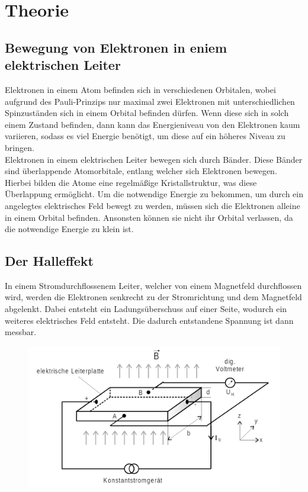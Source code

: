 \section{Theorie}
\label{sec:Theorie}

\subsection{Bewegung von Elektronen in eniem elektrischen Leiter}

\noindent Elektronen in einem Atom befinden sich in verschiedenen Orbitalen, wobei aufgrund des Pauli-Prinzips nur maximal
zwei Elektronen mit unterschiedlichen Spinzuständen sich in einem Orbital befinden dürfen. Wenn diese sich in solch
einem Zustand befinden, dann kann das Energieniveau von den Elektronen kaum variieren, sodass es viel Energie
benötigt, um diese auf ein höheres Niveau zu bringen. \\

\noindent Elektronen in einem elektrischen Leiter bewegen sich durch Bänder. Diese Bänder sind überlappende Atomorbitale,
entlang welcher sich Elektronen bewegen. Hierbei bilden die Atome eine regelmäßige Kristallstruktur, was diese 
Überlappung ermöglicht. Um die notwendige Energie zu bekommen, um durch ein angelegtes elektrisches
Feld bewegt zu werden, müssen sich die Elektronen alleine in einem Orbital befinden. Ansonsten können sie nicht
ihr Orbital verlassen, da die notwendige Energie zu klein ist. 

\subsection{Der Halleffekt}

\noindent In einem Stromdurchflossenem Leiter, welcher von einem Magnetfeld durchflossen wird, werden die Elektronen senkrecht
zu der Stromrichtung und dem Magnetfeld abgelenkt. Dabei entsteht ein Ladungsüberschuss auf einer Seite, wodurch 
ein weiteres elektrisches Feld entsteht. Die dadurch entstandene Spannung ist dann messbar.
\begin{figure}[H]
    \centering
    \includegraphics{Bilder/Halleffekt.png}
    \label{fig:Halleffekt}
\end{figure}

